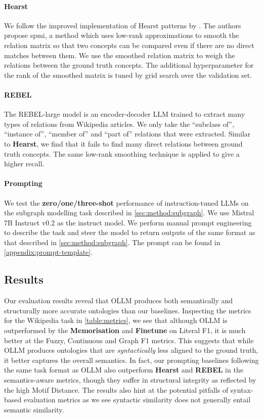 \documentclass{article}
\newcommand{\name}{{OLLM}\xspace}
\begin{document}
\paragraph{Hearst}
We follow the improved implementation of Hearst patterns by \citet{roller2018hearst}. The authors propose spmi, a method which uses low-rank approximations to smooth the relation matrix so that two concepts can be compared even if there are no direct matches between them. We use the smoothed relation matrix to weigh the relations between the ground truth concepts. The additional hyperparameter for the rank of the smoothed matrix is tuned by grid search over the validation set.

\paragraph{REBEL}
The REBEL-large model \cite{cabot2021rebel} is an encoder-decoder LLM trained to extract many types of relations from Wikipedia articles. We only take the ``subclass of'', ``instance of'', ``member of'' and ``part of'' relations that were extracted. Similar to \textbf{Hearst}, we find that it fails to find many direct relations between ground truth concepts. The same low-rank smoothing technique is applied to give a higher recall. 

\paragraph{Prompting}
We test the \textbf{zero/one/three-shot} performance of instruction-tuned LLMs on the subgraph modelling task described in \cref{sec:method:subgraph}. We use Mistral 7B Instruct v0.2 \cite{jiang2023mistral} as the instruct model. We perform manual prompt engineering to describe the task and steer the model to return outputs of the same format as that described in \cref{sec:method:subgraph}. The prompt can be found in \cref{appendix:prompt-template}.

\subsection{Results}



Our evaluation results reveal that \name produces both semantically and structurally more accurate ontologies than our baselines. Inspecting the metrics for the Wikipedia task in \cref{table:metrics}, we see that although \name is outperformed by the \textbf{Memorisation} and \textbf{Finetune} on Literal F1, it is much better at the Fuzzy, Continuous and Graph F1 metrics. This suggests that while \name produces ontologies that are \emph{syntactically} less aligned to the ground truth, it better captures the overall semantics. In fact, our prompting baselines following the same task format as \name also outperform \textbf{Hearst} and \textbf{REBEL} in the semantics-aware metrics, though they suffer in structural integrity as reflected by the high Motif Distance. The results also hint at the potential pitfalls of syntax-based evaluation metrics as we see syntactic similarity does not generally entail semantic similarity.
\end{document}
